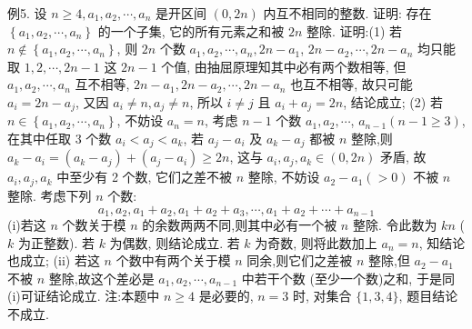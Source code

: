 例5. 设 $n \geqslant 4, a_1, a_2, \cdots, a_n$ 是开区间 $(0,2 n)$ 内互不相同的整数.
证明: 存在 $\left\{a_1, a_2, \cdots, a_n\right\}$ 的一个子集, 它的所有元素之和被 $2 n$ 整除.
证明:(1) 若 $n \notin\left\{a_1, a_2, \cdots, a_n\right\}$, 则 $2 n$ 个数 $a_1, a_2, \cdots, a_n, 2 n-a_1$, $2 n-a_2, \cdots, 2 n-a_n$ 均只能取 $1,2, \cdots, 2 n-1$ 这 $2 n-1$ 个值, 由抽屈原理知其中必有两个数相等, 但 $a_1, a_2, \cdots, a_n$ 互不相等, $2 n-a_1, 2 n-a_2, \cdots, 2 n- a_n$ 也互不相等, 故只可能 $a_i=2 n-a_j$, 又因 $a_i \neq n, a_j \neq n$, 所以 $i \neq j$ 且 $a_i+ a_j=2 n$, 结论成立;
(2) 若 $n \in\left\{a_1, a_2, \cdots, a_n\right\}$, 不妨设 $a_n=n$, 考虑 $n-1$ 个数 $a_1, a_2, \cdots$, $a_{n-1}(n-1 \geqslant 3)$, 在其中任取 3 个数 $a_i<a_j<a_k$, 若 $a_j-a_i$ 及 $a_k-a_j$ 都被 $n$ 整除,则 $a_k-a_i=\left(a_k-a_j\right)+\left(a_j-a_i\right) \geqslant 2 n$, 这与 $a_i, a_j, a_k \in(0,2 n)$ 矛盾, 故 $a_i, a_j, a_k$ 中至少有 2 个数, 它们之差不被 $n$ 整除, 不妨设 $a_2-a_1(>0)$ 不被 $n$ 整除.
考虑下列 $n$ 个数:
$$
a_1, a_2, a_1+a_2, a_1+a_2+a_3, \cdots, a_1+a_2+\cdots+a_{n-1}
$$
(i)若这 $n$ 个数关于模 $n$ 的余数两两不同,则其中必有一个被 $n$ 整除.
令此数为 $k n$ ( $k$ 为正整数). 若 $k$ 为偶数, 则结论成立.
若 $k$ 为奇数, 则将此数加上
$a_n=n$, 知结论也成立;
(ii) 若这 $n$ 个数中有两个关于模 $n$ 同余,则它们之差被 $n$ 整除,但 $a_2-a_1$ 不被 $n$ 整除,故这个差必是 $a_1, a_2, \cdots, a_{n-1}$ 中若干个数 (至少一个数)之和, 于是同(i)可证结论成立.
注:本题中 $n \geqslant 4$ 是必要的, $n=3$ 时, 对集合 $\{1,3,4\}$, 题目结论不成立.



